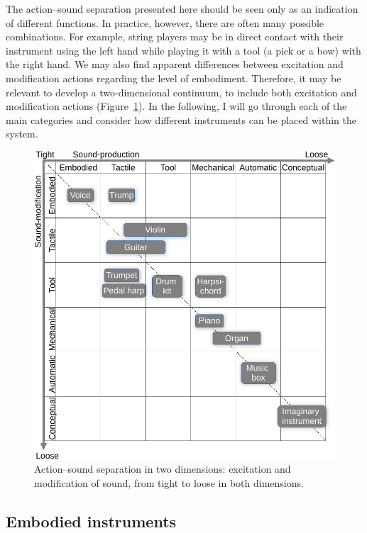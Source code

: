 The action--sound separation presented here should be seen only as an indication of different functions. In practice, however, there are often many possible combinations. For example, string players may be in direct contact with their instrument using the left hand while playing it with a tool (a pick or a bow) with the right hand. We may also find apparent differences between excitation and modification actions regarding the level of embodiment. Therefore, it may be relevant to develop a two-dimensional continuum, to include both excitation and modification actions (Figure~\ref{fig:instrument8}).
In the following, I will go through each of the main categories and consider how different instruments can be placed within the system.

\begin{figure}[tbp]
      \includegraphics[width=\columnwidth]{figures/42-separation2-crop.pdf}
      \caption{Action--sound separation in two dimensions: excitation and modification of sound, from tight to loose in both dimensions.}
            \label{fig:instrument8}
\end{figure}


\subsection{Embodied instruments}

